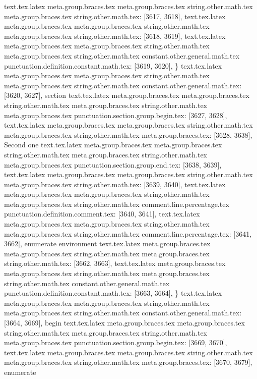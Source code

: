 {{{{{{{{{{{{{{{{{{{{{{{{{{{{{{{{{{{{{{{{{{{{{{{{{{{{{{{{{{{{{{{{{{{{{{{{{{{{{{{{{{{{{{{{{{{{{{{{{{{{{{{{{{{{{{{{text.tex.latex meta.group.braces.tex meta.group.braces.tex string.other.math.tex meta.group.braces.tex string.other.math.tex: [3617, 3618], {
}
text.tex.latex meta.group.braces.tex meta.group.braces.tex string.other.math.tex meta.group.braces.tex string.other.math.tex: [3618, 3619], {
}
text.tex.latex meta.group.braces.tex meta.group.braces.tex string.other.math.tex meta.group.braces.tex string.other.math.tex constant.other.general.math.tex punctuation.definition.constant.math.tex: [3619, 3620], {\}
text.tex.latex meta.group.braces.tex meta.group.braces.tex string.other.math.tex meta.group.braces.tex string.other.math.tex constant.other.general.math.tex: [3620, 3627], {section}
text.tex.latex meta.group.braces.tex meta.group.braces.tex string.other.math.tex meta.group.braces.tex string.other.math.tex meta.group.braces.tex punctuation.section.group.begin.tex: [3627, 3628], {{}
text.tex.latex meta.group.braces.tex meta.group.braces.tex string.other.math.tex meta.group.braces.tex string.other.math.tex meta.group.braces.tex: [3628, 3638], {Second one}
text.tex.latex meta.group.braces.tex meta.group.braces.tex string.other.math.tex meta.group.braces.tex string.other.math.tex meta.group.braces.tex punctuation.section.group.end.tex: [3638, 3639], {}}
text.tex.latex meta.group.braces.tex meta.group.braces.tex string.other.math.tex meta.group.braces.tex string.other.math.tex: [3639, 3640], {
}
text.tex.latex meta.group.braces.tex meta.group.braces.tex string.other.math.tex meta.group.braces.tex string.other.math.tex comment.line.percentage.tex punctuation.definition.comment.tex: [3640, 3641], {%
text.tex.latex meta.group.braces.tex meta.group.braces.tex string.other.math.tex meta.group.braces.tex string.other.math.tex comment.line.percentage.tex: [3641, 3662], {enumerate environment}
text.tex.latex meta.group.braces.tex meta.group.braces.tex string.other.math.tex meta.group.braces.tex string.other.math.tex: [3662, 3663], {
}
text.tex.latex meta.group.braces.tex meta.group.braces.tex string.other.math.tex meta.group.braces.tex string.other.math.tex constant.other.general.math.tex punctuation.definition.constant.math.tex: [3663, 3664], {\}
text.tex.latex meta.group.braces.tex meta.group.braces.tex string.other.math.tex meta.group.braces.tex string.other.math.tex constant.other.general.math.tex: [3664, 3669], {begin}
text.tex.latex meta.group.braces.tex meta.group.braces.tex string.other.math.tex meta.group.braces.tex string.other.math.tex meta.group.braces.tex punctuation.section.group.begin.tex: [3669, 3670], {{}
text.tex.latex meta.group.braces.tex meta.group.braces.tex string.other.math.tex meta.group.braces.tex string.other.math.tex meta.group.braces.tex: [3670, 3679], {enumerate}
}}}}}}}}}}}}}}}}}}}}}}}}}}}}}}}}}}}}}}}}}}}}}}}}}}}}}}}}}}}}}}}}}}}}}}}}}}}}}}}}}}}}}}}}}}}}}}}}}}}}}}}}}}}}}}}}}}}}
